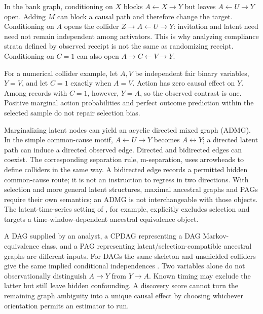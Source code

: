 In the bank graph, conditioning on $X$ blocks $A\leftarrow X\to Y$ but
leaves $A\leftarrow U\to Y$ open. Adding $M$ can block a causal path and
therefore change the target. Conditioning on $A$ opens the collider
$Z\to A\leftarrow U\to Y$: invitation and latent need need not remain
independent among activators. This is why analyzing compliance strata defined
by observed receipt is not the same as randomizing receipt. Conditioning on
$C=1$ can also open $A\to C\leftarrow V\to Y$.

For a numerical collider example, let $A,V$ be independent fair binary
variables, $Y=V$, and let $C=1$ exactly when $A=V$. Action has zero causal
effect on $Y$. Among records with $C=1$, however, $Y=A$, so the observed
contrast is one. Positive marginal action probabilities and perfect outcome
prediction within the selected sample do not repair selection bias.

Marginalizing latent nodes can yield an acyclic directed mixed graph (ADMG).
In the simple common-cause motif, $A\leftarrow U\to Y$ becomes
$A\leftrightarrow Y$; a directed latent path can induce a directed observed
edge. Directed and bidirected edges can coexist. The corresponding separation
rule, m-separation, uses arrowheads to define colliders in the same way.
A bidirected edge records a permitted hidden common-cause route; it is not
an instruction to regress in two directions. With selection and more general
latent structures, maximal ancestral graphs and PAGs require their own
semantics; an ADMG is not interchangeable with those objects. The
latent-time-series setting of \citet[Section 2]{gerhardus2020}, for example,
explicitly excludes selection
and targets a time-window-dependent ancestral equivalence object.

A DAG supplied by an analyst, a CPDAG representing a DAG Markov-equivalence
class, and a PAG representing latent/selection-compatible ancestral graphs
are different inputs. For DAGs the same skeleton and unshielded colliders
give the same implied conditional independences
\citep[Definition 6.24 and Lemma 6.25]{peters2017}. Two variables alone do
not observationally distinguish $A\to Y$ from $Y\to A$. Known timing may
exclude the latter but still leave hidden confounding. A discovery score
cannot turn the remaining graph ambiguity into a unique causal effect by
choosing whichever orientation permits an estimator to run.


